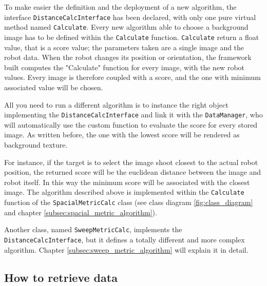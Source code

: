 %
To make easier the definition and the deployment of a new algorithm, the interface
\texttt{DistanceCalcInterface} has been declared, with only one pure virtual method named
\texttt{Calculate}. Every new algorithm able to choose a background image has to be defined
within the \texttt{Calculate} function.
\texttt{Calculate} return a float value, that is a score value; the parameters taken are a
single image and the robot data. When the robot changes its position or orientation, the
framework built computes the "Calculate" function for every image, with the new robot values.
Every image is therefore coupled with a score, and the one with minimum associated value will
be chosen.
%

%
All you need to run a different algorithm is to instance the right object implementing the
\texttt{DistanceCalcInterface} and link it with the \texttt{DataManager}, who will automatically
use the custom function to evaluate the score for every stored image. As written before, the
one with the lowest score will be rendered as background texture.
%

%
For instance, if the target is to select the image shoot closest to the actual robot position,
the returned score will be the euclidean distance between the image and robot itself. In this way
the minimum score will be associated with the closest image.
The algorithm described above is implemented within the \texttt{Calculate} function of the
\texttt{SpacialMetricCalc} class (see class diagram \ref{fig:class_diagram} and chapter
\ref{subsec:spacial_metric_algorithm}).
%

%
Another class, named \texttt{SweepMetricCalc}, implements the
\newline
\texttt{DistanceCalcInterface}, but it defines a totally different and more complex algorithm.
Chapter \ref{subsec:sweep_metric_algorithm} will explain it in detail.

\subsection{How to retrieve data}
\label{sub:howretrievedata}
